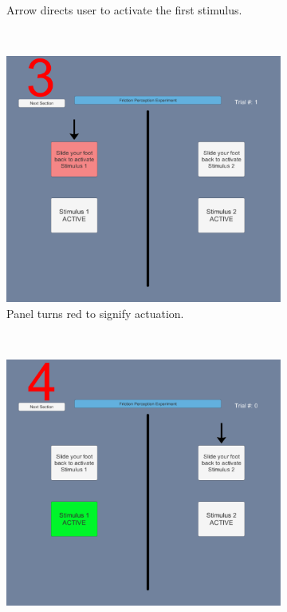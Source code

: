 \documentclass [12pt,letterpaper]{report}
\begin{document}
\begin{figure}[t!]
\begin{subfigure}[t]{0.5\textwidth}
        \caption{Arrow directs user to activate the first stimulus.}
    \end{subfigure}
    ~
    \begin{subfigure}[t]{0.5\textwidth}
        \centering
        \includegraphics[scale=0.215]{fig/perception_interface3}
        \caption{Panel turns red to signify actuation.}
    \end{subfigure}%
    ~ 
    \begin{subfigure}[t]{0.5\textwidth}
        \centering
        \includegraphics[scale=0.215]{fig/perception_interface4}

\end{subfigure}
\end{figure}
\end{document}
